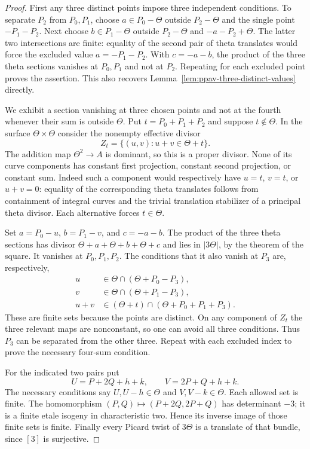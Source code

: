 \begin{proof}
First any three distinct points impose three independent conditions.
To separate $P_2$ from $P_0,P_1$, choose
$a\in P_0-\Theta$ outside $P_2-\Theta$ and the single point
$-P_1-P_2$. Next choose $b\in P_1-\Theta$ outside
$P_2-\Theta$ and $-a-P_2+\Theta$. The latter two intersections
are finite: equality of the second pair of theta translates would
force the excluded value $a=-P_1-P_2$. With $c=-a-b$, the product
of the three theta sections vanishes at $P_0,P_1$ and not at $P_2$.
Repeating for each excluded point proves the assertion. This also
recovers Lemma~\ref{lem:ppav-three-distinct-values} directly.

We exhibit a section vanishing at three chosen points and not at
the fourth whenever their sum is outside $\Theta$. Put
$t=P_0+P_1+P_2$ and suppose $t\notin\Theta$. In the surface
$\Theta\times\Theta$ consider the nonempty effective divisor
\[
        Z_t=\{(u,v):u+v\in\Theta+t\}.
\]
The addition map $\Theta^2\to A$ is dominant, so this is a proper
divisor. None of its curve components has constant first projection,
constant second projection, or constant sum. Indeed such a component
would respectively have $u=t$, $v=t$, or $u+v=0$: equality of the
corresponding theta translates follows from containment of integral
curves and the trivial translation stabilizer of a principal theta
divisor. Each alternative forces $t\in\Theta$.

Set $a=P_0-u$, $b=P_1-v$, and $c=-a-b$. The product of the three
theta sections has divisor
$\Theta+a+\Theta+b+\Theta+c$ and lies in $|3\Theta|$, by the
theorem of the square. It vanishes at $P_0,P_1,P_2$.
The conditions that it also vanish at $P_3$ are, respectively,
\[
 \begin{split}
 u&\in\Theta\cap(\Theta+P_0-P_3),\\
 v&\in\Theta\cap(\Theta+P_1-P_3),\\
 u+v&\in(\Theta+t)\cap(\Theta+P_0+P_1+P_3).
 \end{split}
\]
These are finite sets because the points are distinct. On any
component of $Z_t$ the three relevant maps are nonconstant, so
one can avoid all three conditions. Thus $P_3$ can be separated
from the other three. Repeat with each excluded index to prove
the necessary four-sum condition.

For the indicated two pairs put
\[
             U=P+2Q+h+k,\qquad V=2P+Q+h+k.
\]
The necessary conditions say
$U,U-h\in\Theta$ and $V,V-k\in\Theta$.
Each allowed set is finite. The homomorphism
$(P,Q)\mapsto(P+2Q,2P+Q)$ has determinant $-3$; it is a finite
etale isogeny in characteristic two. Hence its inverse image of
those finite sets is finite. Finally every Picard twist of
$3\Theta$ is a translate of that bundle, since $[3]$ is surjective.
\end{proof}

